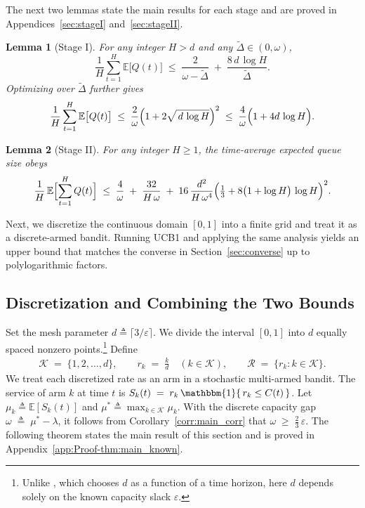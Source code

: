 \documentclass[12pt,draftcls, onecolumn]{IEEEtran}
\newcommand{\velb}{\varepsilon}
\newcommand{\vedisc}{\omega}
\newcommand{\EE}{\mathbb{E}}
\newtheorem{lemma}{Lemma}
\begin{document}
The next two lemmas state the main results for each stage and are proved in Appendices~\ref{sec:stageI} and~\ref{sec:stageII}.

\begin{lemma}[Stage I]\label{thm:log(H)}
For any integer \(H>{d}\) and any \(\tilde\Delta\in(0,\vedisc)\),
\[
\frac{1}{H}\sum_{t=1}^H \EE\bigl[Q(t)\bigr]
\;\le\;
\frac{2}{\vedisc-\tilde\Delta}
\;+\;
\frac{8\,{d}\,\log H}{\tilde\Delta}.
\]
Optimizing over \(\tilde\Delta\) further gives
\[
\frac{1}{H}\sum_{t=1}^H\EE\bigl[Q(t)\bigr]
\;\le\;
\frac{2}{\vedisc}\Bigl(1+2\sqrt{\,{d}\,\log H}\Bigr)^2
\;\le\;
\frac{4}{\vedisc}\Bigl(1+4 {d}\,\log H\Bigr).
\]
\end{lemma}

\begin{lemma}[Stage II]\label{thm:stage2}
For any integer \(H\geq{1}\), the time-average expected queue size obeys
\[
\frac{1}{H}\,\EE\Bigl[\sum_{t=1}^H Q(t)\Bigr]
\;\le\;
\frac{4}{\vedisc}
\;+\;
\frac{32}{H\,\vedisc}
\;+\;
16\,\frac{{d}^2}{H\,\vedisc^4}
\Bigl(
\tfrac13
+8\bigl(1+\log H\bigr)\,\log H
\Bigr)^2.
\]
\end{lemma}

Next, we discretize the continuous domain \([0,1]\) into a finite grid and treat it as a discrete-armed bandit. Running UCB1 and applying the same analysis yields an upper bound that matches the converse in Section~\ref{sec:converse} up to polylogarithmic factors.

\subsection{Discretization and Combining the Two Bounds}
Set the mesh parameter \(d \triangleq \lceil 3/\velb \rceil\). We divide the interval \([0,1]\) into \({d}\) equally spaced nonzero points.\footnote{Unlike \cite{Kleinberg2003}, which chooses \({d}\) as a function of a time horizon, here \({d}\) depends solely on the known capacity slack \(\velb\).} Define
\begin{align}\label{eqn:defs__}
\mathcal{K} \;=\; \{1,2,\dots,{d}\}, 
\qquad
r_k \;=\; \frac{k}{{d}}\quad(k\in\mathcal{K}),
\qquad
\mathcal{R} \;=\; \{r_k : k\in\mathcal{K}\}.
\end{align}
We treat each discretized rate as an arm in a stochastic multi-armed bandit. The service of arm \(k\) at time \(t\) is $S_k(t) \;=\; r_k \,\mathbbm{1}\{\,r_k \le C(t)\,\}$.
Let \(\mu_k \triangleq \EE[S_k(t)]\) and \(\mu^* \triangleq \max_{k\in\mathcal{K}} \mu_k\). With the discrete capacity gap $\vedisc \;\triangleq\; \mu^* - \lambda$, it follows from Corollary~\ref{corr:main_corr} that $\vedisc \;\ge\; \frac{2}{3}\,\velb$. The following theorem states the main result of this section and is proved in Appendix~\ref{app:Proof-thm:main_known}.
\end{document}
